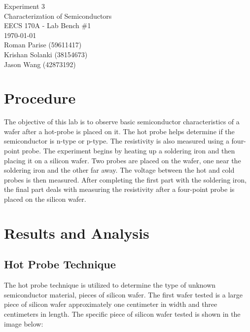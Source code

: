 \documentclass{article}
\begin{document}
	\begin{titlepage}
		\centering
		\Huge{Experiment 3} \\
		\huge{Characterization of Semiconductors} \\
		\vspace{1cm}
		\large{EECS 170A - Lab Bench \#1} \\
		\large{\today} \\
		\vspace{1cm}
		\normalsize{Roman Parise (59611417)} \\
		\normalsize{Krishan Solanki (38154673)} \\
		\normalsize{Jason Wang (42873192)} \\
	\end{titlepage}
	\section{Procedure}
The objective of this lab is to observe basic semiconductor characteristics of a wafer after a hot-probe is placed on it. The hot probe helps determine if the semiconductor is n-type or p-type. The resistivity is also measured using a four-point probe. The experiment begins by heating up a soldering iron and then placing it on a silicon wafer. Two probes are placed on the wafer, one near the soldering iron and the other far away. The voltage between the hot and cold probes is then measured. After completing the first part with the soldering iron, the final part deals with measuring the resistivity after a four-point probe is placed on the silicon wafer. \\

	\section{Results and Analysis}
	\subsection{Hot Probe Technique}
	The hot probe technique is utilized to determine the type of unknown semiconductor material, pieces of silicon wafer. The first wafer tested is a large piece of silicon wafer approximately one centimeter in width and three centimeters in length. The specific piece of silicon wafer tested is shown in the image below:

	\FloatBarrier
	
\end{document}
